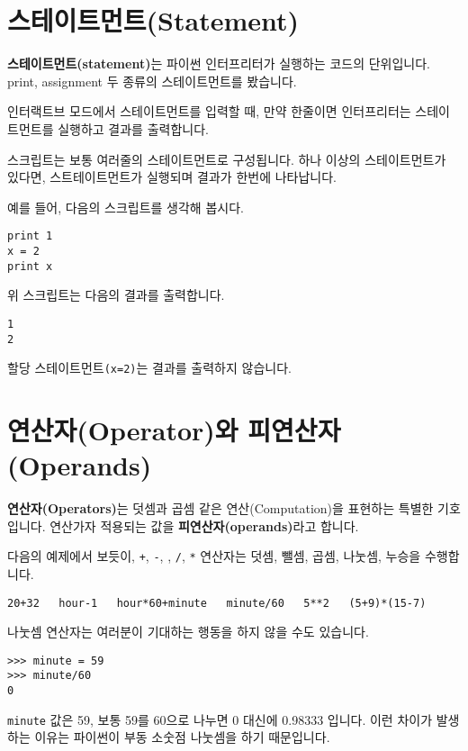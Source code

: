 \section{스테이트먼트(Statement)}

{\bf 스테이트먼트(statement)}는 파이썬 인터프리터가 실행하는 코드의 단위입니다. print, assignment 두 종류의 스테이트먼트를 봤습니다.


인터랙트브 모드에서 스테이트먼트를 입력할 때, 만약 한줄이면 인터프리터는 스테이트먼트를 실행하고 결과를 출력합니다.

스크립트는 보통 여러줄의 스테이트먼트로 구성됩니다. 하나 이상의 스테이트먼트가 있다면, 스트테이트먼트가 실행되며 결과가 한번에 나타납니다.

예를 들어, 다음의 스크립트를 생각해 봅시다.

\beforeverb
\begin{verbatim}
print 1
x = 2
print x
\end{verbatim}
\afterverb
%

위 스크립트는 다음의 결과를 출력합니다.

\beforeverb
\begin{verbatim}
1
2
\end{verbatim}
\afterverb
%
할당 스테이트먼트{\tt (x=2)}는 결과를 출력하지 않습니다.

\section{연산자(Operator)와 피연산자(Operands)}

{\bf 연산자(Operators)}는 덧셈과 곱셈 같은 연산(Computation)을 표현하는 특별한 기호입니다. 연산가자 적용되는 값을 {\bf 피연산자(operands)}라고 합니다.

다음의 예제에서 보듯이, {\tt +}, {\tt -}, {\tt *}, {\tt /}, {\tt **} 연산자는 덧셈, 뺄셈, 곱셈, 나눗셈, 누승을 수행합니다.

\beforeverb
\begin{verbatim}
20+32   hour-1   hour*60+minute   minute/60   5**2   (5+9)*(15-7)
\end{verbatim}
\afterverb
%
나눗셈 연산자는 여러분이 기대하는 행동을 하지 않을 수도 있습니다.

\beforeverb
\begin{verbatim}
>>> minute = 59
>>> minute/60
0
\end{verbatim}
\afterverb
%
{\tt minute} 값은 59, 보통 59를 60으로 나누면 0 대신에 0.98333 입니다. 이런 차이가 발생하는 이유는 파이썬이 부동 소숫점 나눗셈을 하기 때문입니다.

